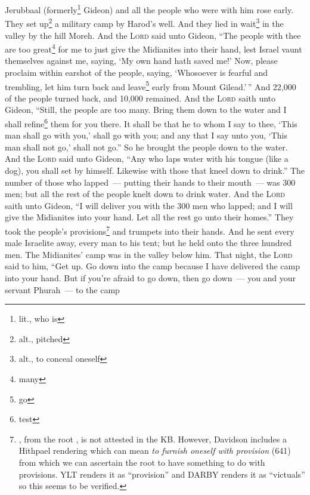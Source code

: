 
\begin{inparaenum}
     Jerubbaal (formerly\footnote{lit., who is} Gideon) and all the people who were with him rose early. They set up\footnote{alt., pitched} a military camp by Harod's well. And they lied in wait\footnote{alt., to conceal oneself} in the valley by the hill Moreh.%
     And the \textsc{Lord} said unto Gideon, ``The people with thee are too great\footnote{many} for me to just give the Midianites into their hand, lest Israel vaunt themselves against me, saying, `My own hand hath saved me!'%
     Now, please proclaim within earshot of the people, saying, `Whosoever is fearful and trembling, let him turn back and leave\footnote{go} early from Mount Gilead.'\,'' And 22,000 of the people turned back, and 10,000 remained.%
     And the \textsc{Lord} saith unto Gideon, ``Still, the people are too many. Bring them down to the water and I shall refine\footnote{test} them for you there. It shall be that he to whom I say to thee, `This man shall go with you,' shall go with you; and any that I say unto you, `This man shall not go,' shall not go.''%
     So he brought the people down to the water. And the \textsc{Lord} said unto Gideon, ``Any who laps water with his tongue (like a dog), you shall set by himself. Likewise with those that kneel down to drink.''%
     The number of those who lapped~--- putting their hands to their mouth~--- was 300 men; but all the rest of the people knelt down to drink water.%
     And the \textsc{Lord} saith unto Gideon, ``I will deliver you with the 300 men who lapped; and I will give the Midianites into your hand. Let all the rest go unto their homes.''%
     They took the people's provisions\footnote{, from the root , is not attested in the KB. However, Davidson includes a Hithpael rendering which can mean \textit{to furnish oneself with provision} (641) from which we can ascertain the root to have something to do with provisions. YLT renders it as ``provision'' and DARBY renders it as ``victuals'' so this seems to be verified.} and trumpets into their hands. And he sent every male Israelite away, every man to his tent; but he held onto the three hundred men. The Midianites' camp was in the valley below him.%
     That night, the \textsc{Lord} said to him, ``Get up. Go down into the camp because I have delivered the camp into your hand.%
     But if you're afraid to go down, then go down~--- you and your servant Phurah~--- to the camp%

\end{inparaenum}
